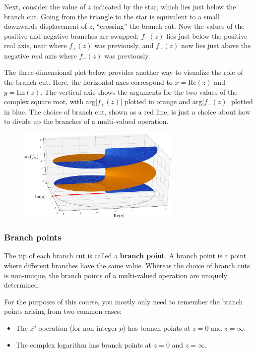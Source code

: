 \documentclass[10pt,a4paper]{article}
\begin{document}
Next, consider the value of $z$ indicated by the star, which lies just
below the branch cut.  Going from the triangle to the star is
equivalent to a small downwards displacement of $z$, ``crossing'' the
branch cut.  Now the values of the positive and negative branches are
swapped: $f_-(z)$ lies just below the positive real axis, near where
$f_+(z)$ was previously, and $f_+(z)$ now lies just above the negative
real axis where $f_-(z)$ was previously.

The three-dimensional plot below provides another way to visualize the
role of the branch cut.  Here, the horizontal axes correspond to $x =
\mathrm{Re}(z)$ and $y = \mathrm{Im}(z)$. The vertical axis shows the
arguments for the two values of the complex square root, with
$\mathrm{arg}\big[f_+(z)\big]$ plotted in orange and
$\mathrm{arg}\big[f_-(z)\big]$ plotted in blue. The choice of branch
cut, shown as a red line, is just a choice about how to divide up the
branches of a multi-valued operation.

\begin{figure}[h]
  \centering\includegraphics[width=0.7\textwidth]{branches}
\end{figure}

\subsubsection{Branch points}
\label{branch-points}

The tip of each branch cut is called a \textbf{branch point}. A branch
point is a point where different branches have the same value. Whereas
the choice of branch cuts is non-unique, the branch points of a
multi-valued operation are uniquely determined.

For the purposes of this course, you mostly only need to remember the
branch points arising from two common cases:

\begin{itemize}
\item The $z^p$ operation (for non-integer $p$) has branch points at
  $z = 0$ and $z = \infty$.

\item The complex logarithm has branch points at $z = 0$ and $z = \infty$.
\end{itemize}
\end{document}
